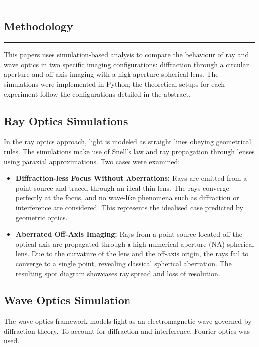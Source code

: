 {\color{gray}\hrule}
\begin{center}
\section{Methodology}
\bigskip
\end{center}
{\color{gray}\hrule}
\begin{multicols}{2}
This papers uses simulation-based analysis to compare the behaviour of ray and wave optics in two specific imaging configurations: diffraction through a circular aperture and off-axis imaging with a high-aperture spherical lens. 
The simulations were implemented in Python; the theoretical setups for each experiment follow the configurations detailed in the abstract.

\subsection{Ray Optics Simulations}
In the ray optics approach, light is modeled as straight lines obeying geometrical rules. 
The simulations make use of Snell's law and ray propagation through lenses using paraxial approximations. 
Two cases were examined:

\begin{itemize}
\item \textbf{Diffraction-less Focus Without Aberrations:} Rays are emitted from a point source and traced through an ideal thin lens. 
The rays converge perfectly at the focus, and no wave-like phenomena such as diffraction or interference 
are considered. This represents the idealised case predicted by geometric optics.

\item \textbf{Aberrated Off-Axis Imaging:} Rays from a point source located off the optical axis are propagated
through a high numerical aperture (NA) spherical lens. Due to the curvature of the lens and the off-axis origin, 
the rays fail to converge to a single point, revealing classical spherical aberration. The resulting spot diagram 
showcases ray spread and loss of resolution.
\end{itemize}

\subsection{Wave Optics Simulation}

The wave optics framework models light as an electromagnetic wave governed by diffraction theory. 
To account for diffraction and interference, Fourier optics was used. 


\end{multicols}
